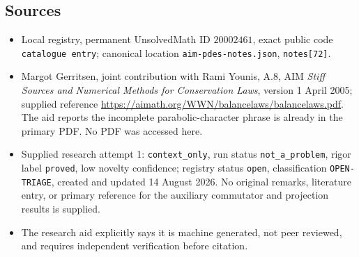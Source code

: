 \documentclass[11pt]{article}
\begin{document}
\subsection{Sources}
\begin{itemize}
\item Local registry, permanent UnsolvedMath ID \(20002461\), exact public code \texttt{catalogue entry}; canonical location \texttt{aim-pdes-notes.json}, \texttt{notes[72]}.
\item Margot Gerritsen, joint contribution with Rami Younis, A.8, AIM \emph{Stiff Sources and Numerical Methods for Conservation Laws}, version 1 April 2005; supplied reference \url{https://aimath.org/WWN/balancelaws/balancelaws.pdf}. The aid reports the incomplete parabolic-character phrase is already in the primary PDF. No PDF was accessed here.
\item Supplied research attempt 1: \texttt{context\_only}, run status \texttt{not\_a\_problem}, rigor label \texttt{proved}, low novelty confidence; registry status \texttt{open}, classification \texttt{OPEN-TRIAGE}, created and updated 14 August 2026. No original remarks, literature entry, or primary reference for the auxiliary commutator and projection results is supplied.
\item The research aid explicitly says it is machine generated, not peer reviewed, and requires independent verification before citation.
\end{itemize}
\end{document}
